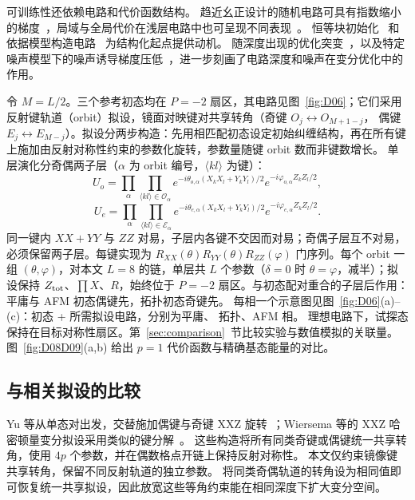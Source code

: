 可训练性还依赖电路和代价函数结构。
趋近幺正设计的随机电路可具有指数缩小的梯度~\cite{mcclean2018barren}，局域与全局代价在浅层电路中也可呈现不同表现~\cite{cerezo2021cost}。
恒等块初始化~\cite{grant2019initialization} 和依据模型构造电路~\cite{wiersema2020exploring} 为结构化起点提供动机。
随深度出现的优化突变~\cite{campos2021abrupt}，以及特定噪声模型下的噪声诱导梯度压低~\cite{wang2021noise}，进一步刻画了电路深度和噪声在变分优化中的作用。

令 $M=L/2$。三个参考初态均在 $P=-2$ 扇区，其电路见图~\ref{fig:D06}；它们采用反射键轨道（orbit）拟设，镜面对映键对共享转角（奇键 $O_j\leftrightarrow O_{M+1-j}$，
偶键 $E_j\leftrightarrow E_{M-j}$）。拟设分两步构造：先用相匹配初态设定初始纠缠结构，再在所有键上施加由反射对称性约束的参数化旋转，参数量随键 orbit 数而非键数增长。
单层演化分奇偶两子层（$\alpha$ 为 orbit 编号，$\langle kl\rangle$ 为键）：
\begin{equation}
U_{o}=\prod_{\alpha}\prod_{\langle kl\rangle\in\mathcal{O}_{\alpha}}e^{-i\theta_{o,\alpha}(X_{k}X_{l}+Y_{k}Y_{l})/2}e^{-i\varphi_{o,\alpha}Z_{k}Z_{l}/2},
\end{equation}
\begin{equation}
U_{e}=\prod_{\alpha}\prod_{\langle kl\rangle\in\mathcal{E}_{\alpha}}e^{-i\theta_{e,\alpha}(X_{k}X_{l}+Y_{k}Y_{l})/2}e^{-i\varphi_{e,\alpha}Z_{k}Z_{l}/2}.
\end{equation}
同一键内 $XX{+}YY$ 与 $ZZ$ 对易，子层内各键不交因而对易；奇偶子层互不对易，必须保留两子层。每键实现为 $R_{XX}(\theta)R_{YY}(\theta)R_{ZZ}(\varphi)$ 门序列。每个 orbit 一组 $(\theta,\varphi)$，对本文 $L=8$ 的链，单层共 $L$ 个参数（$\delta=0$ 时 $\theta=\varphi$，减半）；拟设保持 $Z_{\rm tot}$、$\prod X$、$R$，始终位于 $P=-2$ 扇区。与初态配对重合的子层后作用：平庸与 AFM 初态偶键先，拓扑初态奇键先。
每相一个示意图见图~\ref{fig:D06}(a)--(c)：初态 + 所需拟设电路，分别为平庸、
拓扑、AFM 相。
理想电路下，试探态保持在目标对称性扇区。第~\ref{sec:comparison}~节比较实验与数值模拟的关联量。图~\ref{fig:D08D09}(a,b) 给出 $p=1$ 代价函数与精确基态能量的对比。

\subsection{与相关拟设的比较}
\label{sec:ansatz-comparison}

Yu 等从单态对出发，交替施加偶键与奇键 XXZ 旋转~\cite{yu2023simulating}；Wiersema 等的 XXZ 哈密顿量变分拟设采用类似的键分解~\cite{wiersema2020exploring}。
这些构造将所有同类奇键或偶键统一共享转角，使用 $4p$ 个参数，并在偶数格点开链上保持反射对称性。
本文仅约束镜像键共享转角，保留不同反射轨道的独立参数。
将同类奇偶轨道的转角设为相同值即可恢复统一共享拟设，因此放宽这些等角约束能在相同深度下扩大变分空间。

